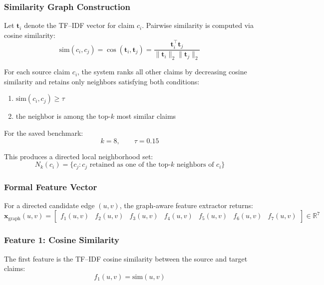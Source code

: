 \documentclass[11pt,a4paper]{article}
\begin{document}
\subsubsection{Similarity Graph Construction}
Let \(\mathbf{t}_i\) denote the TF--IDF vector for claim \(c_i\). Pairwise similarity is computed via cosine similarity:
\begin{equation}
\mathrm{sim}(c_i,c_j) =
\cos(\mathbf{t}_i,\mathbf{t}_j)
=
\frac{\mathbf{t}_i^\top \mathbf{t}_j}{\|\mathbf{t}_i\|_2 \|\mathbf{t}_j\|_2}
\end{equation}

For each source claim \(c_i\), the system ranks all other claims by decreasing cosine similarity and retains only neighbors satisfying both conditions:
\begin{enumerate}[label=\arabic*.]
  \item \(\mathrm{sim}(c_i,c_j) \ge \tau\)
  \item the neighbor is among the top-\(k\) most similar claims
\end{enumerate}

For the saved benchmark:
\[
k = 8, \qquad \tau = 0.15
\]

This produces a directed local neighborhood set:
\begin{equation}
N_k(c_i) = \{c_j : c_j \text{ retained as one of the top-}k\text{ neighbors of } c_i\}
\end{equation}

\subsubsection{Formal Feature Vector}
For a directed candidate edge \((u,v)\), the graph-aware feature extractor returns:
\begin{equation}
\mathbf{x}_{\text{graph}}(u,v) =
\begin{bmatrix}
f_1(u,v) & f_2(u,v) & f_3(u,v) & f_4(u,v) & f_5(u,v) & f_6(u,v) & f_7(u,v)
\end{bmatrix}
\in \mathbb{R}^7
\end{equation}

\subsubsection{Feature 1: Cosine Similarity}
The first feature is the TF--IDF cosine similarity between the source and target claims:
\begin{equation}
f_1(u,v) = \mathrm{sim}(u,v)
\end{equation}
\end{document}
